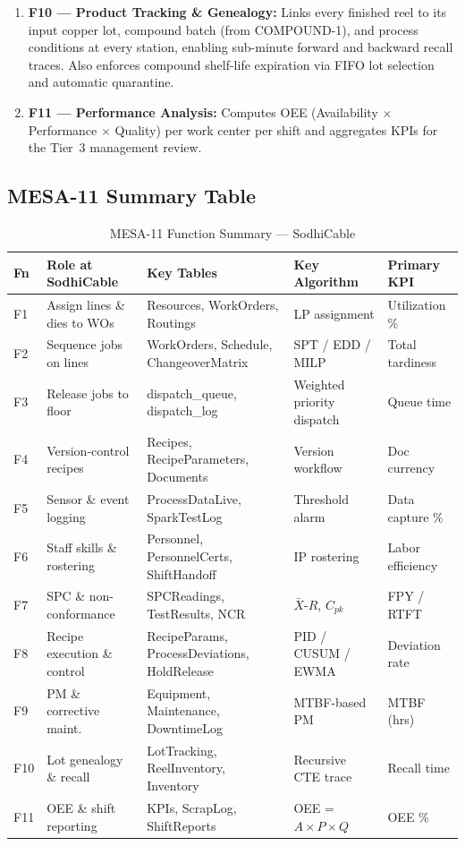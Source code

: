 \documentclass[11pt]{article}
\begin{document}
\begin{enumerate}[leftmargin=1.8em, itemsep=1pt]
\item \textbf{F10 --- Product Tracking \& Genealogy:} Links every finished reel to its input copper lot, compound batch (from COMPOUND-1), and process conditions at every station, enabling sub-minute forward and backward recall traces.  Also enforces compound shelf-life expiration via FIFO lot selection and automatic quarantine.
\item \textbf{F11 --- Performance Analysis:} Computes OEE (Availability $\times$ Performance $\times$ Quality) per work center per shift and aggregates KPIs for the Tier~3 management review.
\end{enumerate}

\subsection{MESA-11 Summary Table}

\begin{table}[H]\centering\small
\caption{MESA-11 Function Summary --- SodhiCable}
\begin{tabularx}{\textwidth}{@{} l L{3.2cm} L{3.0cm} L{3.0cm} L{2.2cm} @{}}
\toprule
\textbf{Fn} & \textbf{Role at SodhiCable} & \textbf{Key Tables} & \textbf{Key Algorithm} & \textbf{Primary KPI} \\
\midrule
F1  & Assign lines \& dies to WOs & Resources, Work\-Orders, Routings & LP assignment & Utilization \% \\
F2  & Sequence jobs on lines & Work\-Orders, Schedule, Changeover\-Matrix & SPT / EDD / MILP & Total tardiness \\
F3  & Release jobs to floor & dispatch\_queue, dispatch\_log & Weighted priority dispatch & Queue time \\
F4  & Version-control recipes & Recipes, Recipe\-Parameters, Documents & Version workflow & Doc currency \\
F5  & Sensor \& event logging & Process\-Data\-Live, Spark\-Test\-Log & Threshold alarm & Data capture \% \\
F6  & Staff skills \& rostering & Personnel, Personnel\-Certs, Shift\-Handoff & IP rostering & Labor efficiency \\
F7  & SPC \& non-conformance & SPC\-Readings, Test\-Results, NCR & $\bar{X}$-$R$, $C_{pk}$ & FPY / RTFT \\
F8  & Recipe execution \& control & Recipe\-Params, Process\-Deviations, Hold\-Release & PID / CUSUM / EWMA & Deviation rate \\
F9  & PM \& corrective maint. & Equipment, Maintenance, Downtime\-Log & MTBF-based PM & MTBF (hrs) \\
F10 & Lot genealogy \& recall & Lot\-Tracking, Reel\-Inventory, Inventory & Recursive CTE trace & Recall time \\
F11 & OEE \& shift reporting & KPIs, Scrap\-Log, Shift\-Reports & OEE = $A \times P \times Q$ & OEE \% \\
\bottomrule
\end{tabularx}
\end{table}
\end{document}
